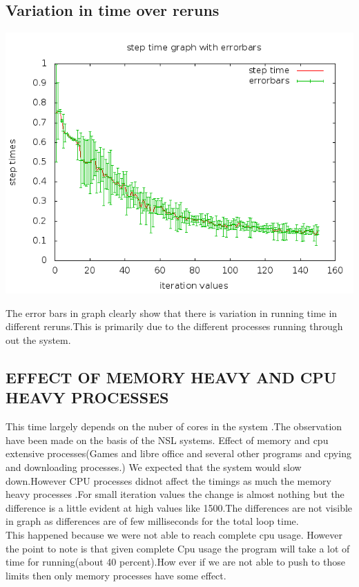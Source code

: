 \documentclass[11pt]{article}
\begin{document}
\subsection{Variation in time over reruns}
\begin{center}
  \includegraphics[scale=.75]{g03_plot03.png}
\end{center}
The error bars in graph clearly show that there is variation in running time in different reruns.This is primarily due to the different  processes running through out the system.
\subsection{EFFECT OF MEMORY HEAVY AND CPU HEAVY PROCESSES}
This time largely depends on the nuber of cores in the system .The observation have been made on the basis of the NSL systems.
Effect of memory and cpu extensive processes(Games and libre office and several other programs and cpying and downloading processes.)
We expected that the system would slow down.However CPU processes didnot affect the timings as much the memory heavy processes .For small iteration values the change is almost nothing but the difference is a little evident at high values like 1500.The differences are not visible in graph as differences are of few milliseconds for the total loop time.\\
This happened because we were not able  to reach complete cpu usage.
However the point to note is that given complete Cpu usage the program will take a lot of time for running(about 40 percent).How ever if we are not able to push to those limits then only memory processes have some effect. 
\end{document}
